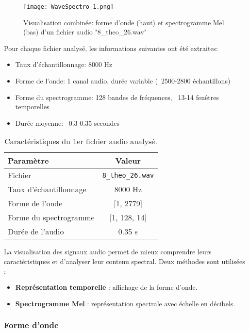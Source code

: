 \documentclass{article}
\begin{document}
\begin{figure}[H]
    \centering
    \texttt{[image: WaveSpectro\_1.png]}
    \caption{Visualisation combinée: forme d'onde (haut) et spectrogramme Mel (bas) d'un fichier audio "8\_theo\_26.wav"}
    \label{fig:waveform_spec_1}
\end{figure}

Pour chaque fichier analysé, les informations suivantes ont été extraites:
\begin{itemize}
    \item Taux d'échantillonnage: 8000 Hz
    \item Forme de l'onde: 1 canal audio, durée variable (~2500-2800 échantillons)
    \item Forme du spectrogramme: 128 bandes de fréquences, ~13-14 fenêtres temporelles
    \item Durée moyenne: ~0.3-0.35 secondes
\end{itemize}

\begin{table}[H]
    \centering
    \begin{tabular}{|l|c|}
        \hline
        \textbf{Paramètre} & \textbf{Valeur} \\
        \hline
        Fichier & \texttt{8\_theo\_26.wav} \\
        Taux d’échantillonnage & 8000 Hz \\
        Forme de l’onde & [1, 2779] \\
        Forme du spectrogramme & [1, 128, 14] \\
        Durée de l’audio & 0.35 s \\
        \hline
    \end{tabular}
    \caption{Caractéristiques du 1er fichier audio analysé.}
    \label{tab:audio_info}
\end{table}

La visualisation des signaux audio permet de mieux comprendre leurs caractéristiques et d’analyser leur contenu spectral. Deux méthodes sont utilisées :

\begin{itemize}
    \item \textbf{Représentation temporelle} : affichage de la forme d’onde.
    \item \textbf{Spectrogramme Mel} : représentation spectrale avec échelle en décibels.
\end{itemize}

\subsubsection{Forme d’onde}
\end{document}
